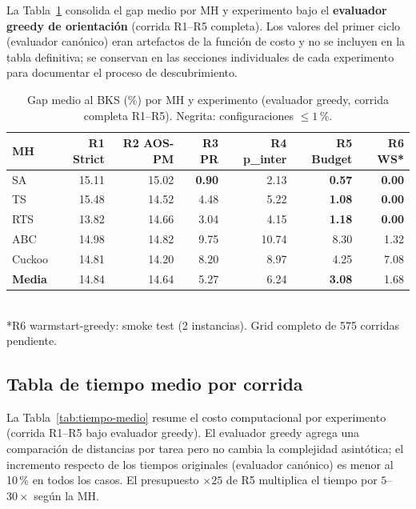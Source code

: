 La Tabla~\ref{tab:comparativa-global} consolida el gap medio por MH y
experimento bajo el \textbf{evaluador greedy de orientación} (corrida
R1--R5 completa). Los valores del primer ciclo (evaluador canónico)
eran artefactos de la función de costo y no se incluyen en la tabla
definitiva; se conservan en las secciones individuales de cada
experimento para documentar el proceso de descubrimiento.

\begin{table}[h]
\centering
\caption{Gap medio al BKS (\%) por MH y experimento (evaluador greedy,
         corrida completa R1--R5). Negrita: configuraciones $\leq 1$\,\%.}
\label{tab:comparativa-global}
\small
\begin{tabular}{lrrrrrr}
\toprule
MH & R1 Strict & R2 AOS-PM & R3 PR & R4 p\_inter & R5 Budget & R6 WS* \\
\midrule
SA      & 15.11 & 15.02 & \textbf{0.90} & 2.13 & \textbf{0.57} & \textbf{0.00} \\
TS      & 15.48 & 14.52 & 4.48          & 5.22 & \textbf{1.08} & \textbf{0.00} \\
RTS     & 13.82 & 14.66 & 3.04          & 4.15 & \textbf{1.18} & \textbf{0.00} \\
ABC     & 14.98 & 14.82 & 9.75          & 10.74 & 8.30         & 1.32 \\
Cuckoo  & 14.81 & 14.20 & 8.20          & 8.97  & 4.25         & 7.08 \\
\midrule
\textbf{Media} & 14.84 & 14.64 & 5.27 & 6.24 & \textbf{3.08} & 1.68 \\
\bottomrule
\end{tabular}
\\[4pt]
\footnotesize
*R6 warmstart-greedy: smoke test (2 instancias). Grid completo de 575 corridas pendiente.
\end{table}

\subsection{Tabla de tiempo medio por corrida}

La Tabla~\ref{tab:tiempo-medio} resume el costo computacional por
experimento (corrida R1--R5 bajo evaluador greedy). El evaluador greedy
agrega una comparación de distancias por tarea pero no cambia la
complejidad asintótica; el incremento respecto de los tiempos originales
(evaluador canónico) es menor al 10\,\% en todos los casos. El
presupuesto $\times 25$ de R5 multiplica el tiempo por
$5$--$30\times$ según la MH.

